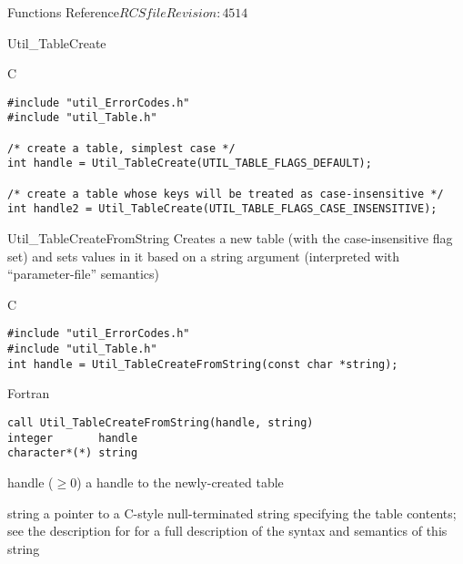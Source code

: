 \begin{cactuspart}{ Functions Reference}{$RCSfile$}{$Revision: 4514 $}
\begin{FunctionDescription}{Util\_TableCreate}
\begin{ExampleSection}
\begin{Example}{C}
\begin{verbatim}
#include "util_ErrorCodes.h"
#include "util_Table.h"

/* create a table, simplest case */
int handle = Util_TableCreate(UTIL_TABLE_FLAGS_DEFAULT);

/* create a table whose keys will be treated as case-insensitive */
int handle2 = Util_TableCreate(UTIL_TABLE_FLAGS_CASE_INSENSITIVE);
\end{verbatim}
\end{Example}
\end{ExampleSection}
\end{FunctionDescription}


\begin{FunctionDescription}{Util\_TableCreateFromString}
\label{Util-TableCreateFromString}
Creates a new table (with the case-insensitive flag set) and sets
values in it based on a string argument (interpreted with
``parameter-file'' semantics)

\begin{SynopsisSection}
\begin{Synopsis}{C}
\begin{verbatim}
#include "util_ErrorCodes.h"
#include "util_Table.h"
int handle = Util_TableCreateFromString(const char *string);
\end{verbatim}
\end{Synopsis}
\begin{Synopsis}{Fortran}
\begin{verbatim}
call Util_TableCreateFromString(handle, string)
integer       handle
character*(*) string
\end{verbatim}
\end{Synopsis}
\end{SynopsisSection}

\begin{ResultSection}
\begin{Result}{handle ($\ge 0$)}
a handle to the newly-created table
\end{Result}
\end{ResultSection}

\begin{ParameterSection}
\begin{Parameter}{string}
a pointer to a C-style null-terminated string specifying the table
contents; see the description for 
for a full description of the syntax and semantics of this string
\end{Parameter}
\end{ParameterSection}


\end{FunctionDescription}
\end{cactuspart}
